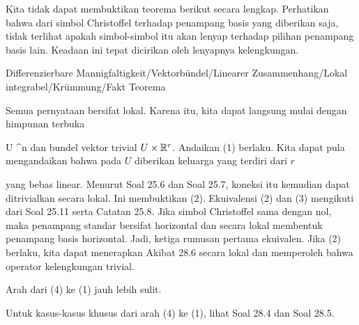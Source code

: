 
Kita tidak dapat membuktikan teorema berikut secara lengkap. Perhatikan bahwa dari simbol Christoffel terhadap penampang basis yang diberikan
 {} {}
saja, tidak terlihat apakah simbol-simbol itu akan lenyap terhadap pilihan penampang basis lain. Keadaan ini tepat dicirikan oleh lenyapnya kelengkungan.


{Differenzierbare Mannigfaltigkeit/Vektorbündel/Linearer Zusammenhang/Lokal integrabel/Krümmung/Fakt}
{Teorema}
{}
{

\faktzusatz {}
\faktzusatz {}

}
{

Semua pernyataan bersifat lokal. Karena itu, kita dapat langsung mulai dengan himpunan terbuka

\mavergleichskette
{\vergleichskette
{ U
}
{ \subseteq }{ \R^n
}
{  }{
}
{    }{
}
{   }{
}
}
{}{}{}
dan bundel vektor trivial $U \times {\mathbb R}^r$. Andaikan (1) berlaku. Kita dapat pula mengandaikan bahwa pada $U$ diberikan keluarga yang terdiri dari $r$

 yang bebas linear. Menurut
Soal 25.6
dan
Soal 25.7,
koneksi itu kemudian dapat ditrivialkan secara lokal. Ini membuktikan (2). Ekuivalensi (2) dan (3) mengikuti dari
Soal 25.11
serta
Catatan 25.8.
Jika simbol Christoffel sama dengan nol, maka penampang standar bersifat horizontal dan secara lokal membentuk penampang basis horizontal. Jadi, ketiga rumusan pertama ekuivalen. Jika (2) berlaku, kita dapat menerapkan
Akibat 28.6
secara lokal dan memperoleh bahwa operator kelengkungan trivial.

Arah dari (4) ke (1) jauh lebih sulit.

}

Untuk kasus-kasus khusus dari arah (4) ke (1), lihat
Soal 28.4
dan
Soal 28.5.

